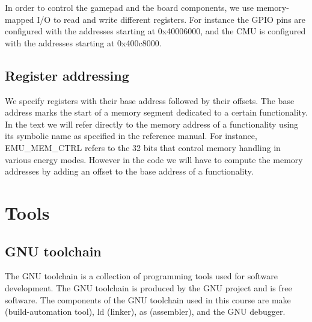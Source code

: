 In order to control the gamepad and the board components, we use memory-mapped I/O to read and write different registers. For instance the GPIO pins are configured with the addresses starting at 0x40006000, and the CMU is configured with the addresses starting at 0x400c8000.


\subsection{Register addressing}
We specify registers with their base address followed by their offsets. The base address marks the start of a memory segment dedicated to a certain functionality. In the text we will refer directly to the memory address of a functionality using its symbolic name as specified in the reference manual. For instance, EMU\_MEM\_CTRL refers to the 32 bits that control memory handling in various energy modes. However in the code we will have to compute the memory addresses by adding an offset to the base address of a functionality.



\section{Tools}

\subsection{GNU toolchain}
The GNU toolchain is a collection of programming tools used for software development. The GNU toolchain is produced by the GNU project and is free software. The components of the GNU toolchain used in this course are make (build-automation tool), ld (linker), as (assembler), and the GNU debugger.\cite{gnu.org}

